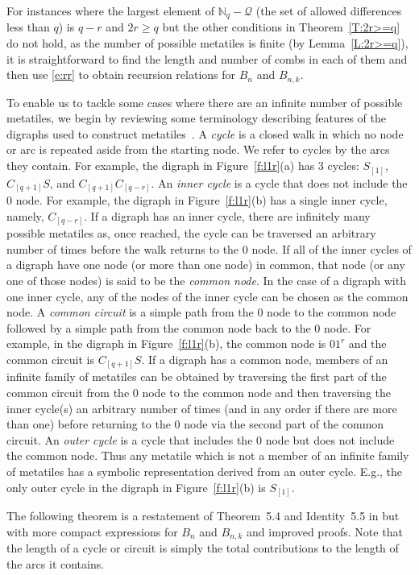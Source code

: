 \documentclass[preprint,3p]{elsarticle}
\providecommand{\Nset}{\mathbb{N}}
\begin{document}
For instances where the largest element of $\Nset_q-\mathcal{Q}$ (the
set of allowed differences less than $q$) is $q-r$ and $2r\geq q$ but
the other conditions in Theorem~\ref{T:2r>=q} do not hold, as the
number of possible metatiles is finite (by Lemma~\ref{L:2r>=q}), it is
straightforward to find the length and number of combs in each of them
and then use \eqref{e:rr} to obtain recursion relations for $B_n$ and
$B_{n,k}$.

To enable us to tackle some cases where there are an infinite number
of possible metatiles, we begin by reviewing some terminology
describing features of the digraphs used to construct
metatiles~\cite{EA15}. A \textit{cycle} is a closed walk in which no
node or arc is repeated aside from the starting node.  We refer to
cycles by the arcs they contain. For example, the digraph in
Figure~\ref{f:l1r}(a) has 3 cycles: $S_{[1]}$, $C_{[q+1]}S$, and
$C_{[q+1]}C_{[q-r]}$.  An \textit{inner cycle} is a cycle that does
not include the 0 node. For example, the digraph in
Figure~\ref{f:l1r}(b) has a single inner cycle, namely, $C_{[q-r]}$.  If
a digraph has an inner cycle, there are infinitely many possible
metatiles as, once reached, the cycle can be traversed an arbitrary
number of times before the walk returns to the 0 node.  If all of the
inner cycles of a digraph have one node (or more than one node) in
common, that node (or any one of those nodes) is said to be the
\textit{common node}. In the case of a digraph with one inner cycle,
any of the nodes of the inner cycle can be chosen as the common node.
A \textit{common circuit} is a simple path from the 0 node to the
common node followed by a simple path from the common node back to the
0 node. For example, in the digraph in Figure~\ref{f:l1r}(b), the common
node is $01^r$ and the common circuit is $C_{[q+1]}S$.  If a digraph
has a common node, members of an infinite family of metatiles can be
obtained by traversing the first part of the common circuit from the 0
node to the common node and then traversing the inner cycle(s) an
arbitrary number of times (and in any order if there are more than
one) before returning to the 0 node via the second part of the common
circuit. An \textit{outer cycle} is a cycle that includes the 0 node
but does not include the common node. Thus any metatile which is
not a member of an infinite family of metatiles has a symbolic
representation derived from an outer cycle. E.g., the only outer cycle
in the digraph in Figure~\ref{f:l1r}(b) is $S_{[1]}$.

The following theorem is a restatement of Theorem~5.4 and Identity~5.5
in \cite{EA15} but with more compact expressions for $B_n$ and
$B_{n,k}$ and improved proofs. Note that the length of a cycle or
circuit is simply the total contributions to the length of the arcs it contains.
\end{document}
